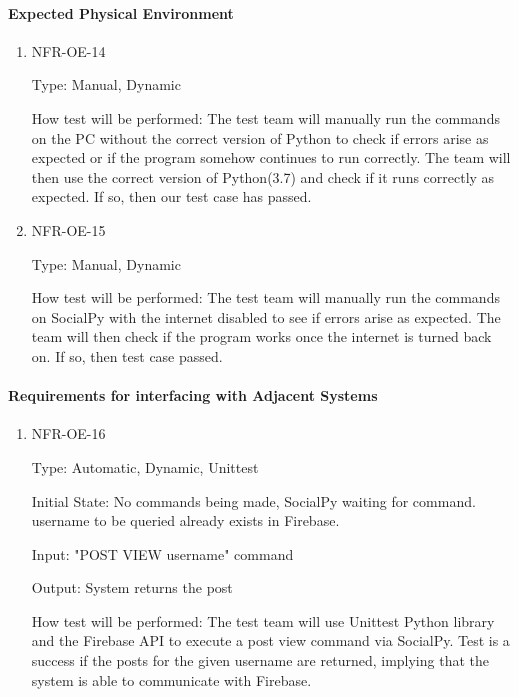 \documentclass[12pt, titlepage]{article}
\begin{document}
\paragraph{Expected Physical Environment}
\begin{enumerate}
    \item{NFR-OE-14\\}
    
    Type: Manual, Dynamic
    
    How test will be performed: The test team will manually run the commands on the PC without the correct version of Python to check if errors arise as expected or if the program somehow continues to run correctly. The team will then use the correct version of Python(3.7) and check if it runs correctly as expected. If so, then our test case has passed.
    
    \item{NFR-OE-15\\}
    
    Type: Manual, Dynamic
    
    How test will be performed: The test team will manually run the commands on SocialPy with the internet disabled to see if errors arise as expected. The team will then check if the program works once the internet is turned back on. If so, then test case passed.
    

 \end{enumerate} 
 
 \paragraph{Requirements for interfacing with Adjacent Systems}
\begin{enumerate}
    \item{NFR-OE-16\\}
    
    Type: Automatic, Dynamic, Unittest
    
    Initial State: No commands being made, SocialPy waiting for command. username to be queried already exists in Firebase.
    
    Input: "POST VIEW username" command
    
    Output: System returns the post
    
    How test will be performed: The test team will use Unittest Python library and the Firebase API to execute a post view command via SocialPy. Test is a success if the posts for the given username are returned, implying that the system is able to communicate with Firebase.
    

 \end{enumerate} 
 
\end{document}
